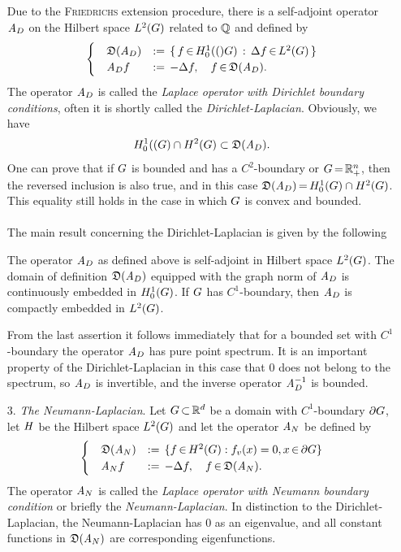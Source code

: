 \documentclass[11pt,twoside]{article}
\begin{document}
\begin{itemize}[leftmargin=5mm]
\subparagraph*{}
Due to the \textsc{Friedrichs} extension procedure,
there is a self-adjoint operator $\linA_D$ on the Hilbert space $L^2(\G)$
related to $\Q$ and defined by
\[
\begin{cases}
\quad \domain{\linA_D} & := \,
\set{f \xeof \HN{1}(\G)}{\Delta f \xeof L^2(\G)} \\
\quad \linA_D f & := \,
- \Delta f, \quad f \xeof \domain{\linA_D}. \\
\end{cases}
\] 
The operator $\linA_D$ is called the
\textit{Laplace operator with Dirichlet boundary conditions},
often it is shortly called the \textit{Dirichlet-Laplacian}.
Obviously,
we have
\[
\HN{1}{(\G} \cap H^2(\G) \subset \domain{\linA_D}.
\]
One can prove that
if $\G$ is bounded and has a $C^2$-boundary or $\G \eq \R_+^n$,
then the reversed inclusion is also true,
and in this case $\domain{\linA_D} \eq \HN{1}{\G} \cap H^2(\G)$.
This equality still holds in the case in which $\G$ is convex and bounded.

\paragraph*{}
The main result concerning the Dirichlet-Laplacian is given by the following

\begin{theorem}
The operator $\linA_D$ as defined above is self-adjoint in Hilbert space $\Lh$.
The domain of definition $\domain{\linA_D}$ equipped with the graph norm of 
$\linA_D$ is continuously embedded in $\HN{1}{\G}$.
If $\G$ has $C^1$-boundary,
then $\linA_D$ is compactly embedded in $\Lh$.
\end{theorem}

From the last assertion it follows immediately that
for a bounded set with $C^1$-boundary the operator $\linA_D$ has
pure point spectrum.
It is an important property of the Dirichlet-Laplacian in this case
that $0$ does not belong to the spectrum,
so $\linA_D$ is invertible,
and the inverse operator $\linA_D^{-1}$ is bounded.

\item[3.]
\textit{The Neumann-Laplacian}.
Let $G {\,\subset\,} {\mathbb{R}}^d$ be a domain with $C^1$-boundary $\partial G$,
let $\mathit{H}$ be the Hilbert space $\Lh$ and let the operator $\mathit{A}_N$
be defined by
\[
\begin{cases}
\quad \mathfrak{D}(\mathit{A}_N) & := \,
\{ f {\,\in\,} H^2(G): f_v(x)= 0, x {\,\in\,} \partial G \} \\
\quad \mathit{A}_N f & := \,
- \Delta f, \quad f {\,\in\,} \mathfrak{D}(\mathit{A}_N). \\
\end{cases}
\]
The operator $\mathit{A}_N$ is called the
\textit{Laplace operator with Neumann boundary condition}
or briefly the \textit{Neumann-Laplacian}.
In distinction to the Dirichlet-Laplacian,
the Neumann-Laplacian has $0$ as an eigenvalue,
and all constant functions in $\mathfrak{D}(\mathit{A}_N)$
are corresponding eigenfunctions.
\end{itemize}
\end{document}
